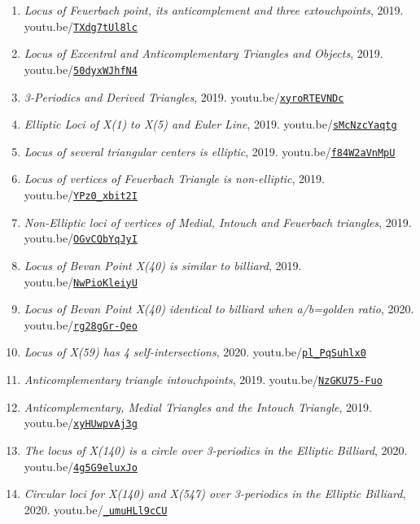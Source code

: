 \documentclass[12pt]{article}
\begin{document}
\begin{enumerate}[resume]
\item \textit{Locus of Feuerbach point, its anticomplement and three extouchpoints}, 2019. youtu.be/\href{https://youtu.be/TXdg7tUl8lc}{\nolinkurl{TXdg7tUl8lc}}
\item \textit{Locus of Excentral and Anticomplementary Triangles and Objects}, 2019. youtu.be/\href{https://youtu.be/50dyxWJhfN4}{\nolinkurl{50dyxWJhfN4}}
\item \textit{3-Periodics and Derived Triangles}, 2019. youtu.be/\href{https://youtu.be/xyroRTEVNDc}{\nolinkurl{xyroRTEVNDc}}
\item \textit{Elliptic Loci of X(1) to X(5) and Euler Line}, 2019. youtu.be/\href{https://youtu.be/sMcNzcYaqtg}{\nolinkurl{sMcNzcYaqtg}}
\item \textit{Locus of several triangular centers is elliptic}, 2019. youtu.be/\href{https://youtu.be/f84W2aVnMpU}{\nolinkurl{f84W2aVnMpU}}
\item \textit{Locus of vertices of Feuerbach Triangle is non-elliptic}, 2019. youtu.be/\href{https://youtu.be/YPz0_xbit2I}{\nolinkurl{YPz0\_xbit2I}}
\item \textit{Non-Elliptic loci of vertices of Medial, Intouch and Feuerbach triangles}, 2019. youtu.be/\href{https://youtu.be/OGvCQbYqJyI}{\nolinkurl{OGvCQbYqJyI}}
\item \textit{Locus of Bevan Point X(40) is similar to billiard}, 2019. youtu.be/\href{https://youtu.be/NwPioKleiyU}{\nolinkurl{NwPioKleiyU}}
\item \textit{Locus of Bevan Point X(40) identical to billiard when a/b=golden ratio}, 2020. youtu.be/\href{https://youtu.be/rg28gGr-Qeo}{\nolinkurl{rg28gGr-Qeo}}
\item \textit{Locus of X(59) has 4 self-intersections}, 2020. youtu.be/\href{https://youtu.be/pl_PqSuhlx0}{\nolinkurl{pl\_PqSuhlx0}}
\item \textit{Anticomplementary triangle intouchpoints}, 2019. youtu.be/\href{https://youtu.be/NzGKU75-Fuo}{\nolinkurl{NzGKU75-Fuo}}
\item \textit{Anticomplementary, Medial Triangles and the Intouch Triangle}, 2019. youtu.be/\href{https://youtu.be/xyHUwpvAj3g}{\nolinkurl{xyHUwpvAj3g}}
\item \textit{The locus of X(140) is a circle over 3-periodics in the Elliptic Billiard}, 2020. youtu.be/\href{https://youtu.be/4g5G9eluxJo}{\nolinkurl{4g5G9eluxJo}}
\item \textit{Circular loci for X(140) and X(547) over 3-periodics in the Elliptic Billiard}, 2020. youtu.be/\href{https://youtu.be/_umuHLl9cCU}{\nolinkurl{\_umuHLl9cCU}}

\end{enumerate}
\end{document}
